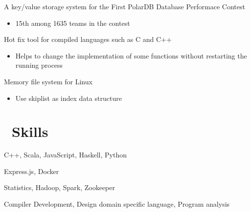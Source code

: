\documentclass{resume}
\begin{document}
A key/value storage system for the First PolarDB Database Performace Contest
\begin{itemize}
	\item 15th among 1635 teams in the contest
\end{itemize}

Hot fix tool for compiled languages such as C and C++
\begin{itemize}
  \item Helps to change the implementation of some functions without restarting the running process
\end{itemize}


Memory file system for Linux
\begin{itemize}
	\item Use skiplist as index data structure
\end{itemize}

\section{\faCogs\ Skills}	
   C++, Scala, JavaScript, Haskell, Python

   Express.js, Docker
   
	Statistics, Hadoop, Spark, Zookeeper
  
	Compiler Development, Design domain specific language, Program analysis
\end{document}
